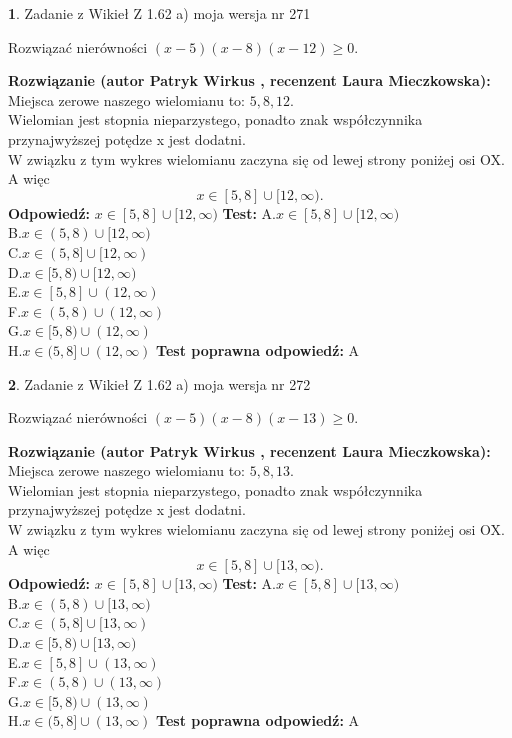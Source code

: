 \documentclass[12pt, a4paper]{article}
\theoremstyle{definition} %
\newtheorem{zad}{}
\newcommand{\zadStart}[1]{\begin{zad}#1\newline}
\newcommand{\zadStop}{\end{zad}}
\newcommand{\rozwStart}[2]{\noindent \textbf{Rozwiązanie (autor #1 , recenzent #2): }\newline}
\newcommand{\rozwStop}{\newline}
\newcommand{\odpStart}{\noindent \textbf{Odpowiedź:}\newline}
\newcommand{\odpStop}{\newline}
\newcommand{\testStart}{\noindent \textbf{Test:}\newline}
\newcommand{\testStop}{\newline}
\newcommand{\kluczStart}{\noindent \textbf{Test poprawna odpowiedź:}\newline}
\newcommand{\kluczStop}{\newline}
\begin{document}
\zadStart{Zadanie z Wikieł Z 1.62 a) moja wersja nr 271}

Rozwiązać nierówności $(x-5)(x-8)(x-12)\ge0$.
\zadStop
\rozwStart{Patryk Wirkus}{Laura Mieczkowska}
Miejsca zerowe naszego wielomianu to: $5, 8, 12$.\\
Wielomian jest stopnia nieparzystego, ponadto znak współczynnika przy\linebreak najwyższej potędze x jest dodatni.\\ W związku z tym wykres wielomianu zaczyna się od lewej strony poniżej osi OX. A więc $$x \in [5,8] \cup [12,\infty).$$
\rozwStop
\odpStart
$x \in [5,8] \cup [12,\infty)$
\odpStop
\testStart
A.$x \in [5,8] \cup [12,\infty)$\\
B.$x \in (5,8) \cup [12,\infty)$\\
C.$x \in (5,8] \cup [12,\infty)$\\
D.$x \in [5,8) \cup [12,\infty)$\\
E.$x \in [5,8] \cup (12,\infty)$\\
F.$x \in (5,8) \cup (12,\infty)$\\
G.$x \in [5,8) \cup (12,\infty)$\\
H.$x \in (5,8] \cup (12,\infty)$
\testStop
\kluczStart
A
\kluczStop



\zadStart{Zadanie z Wikieł Z 1.62 a) moja wersja nr 272}

Rozwiązać nierówności $(x-5)(x-8)(x-13)\ge0$.
\zadStop
\rozwStart{Patryk Wirkus}{Laura Mieczkowska}
Miejsca zerowe naszego wielomianu to: $5, 8, 13$.\\
Wielomian jest stopnia nieparzystego, ponadto znak współczynnika przy\linebreak najwyższej potędze x jest dodatni.\\ W związku z tym wykres wielomianu zaczyna się od lewej strony poniżej osi OX. A więc $$x \in [5,8] \cup [13,\infty).$$
\rozwStop
\odpStart
$x \in [5,8] \cup [13,\infty)$
\odpStop
\testStart
A.$x \in [5,8] \cup [13,\infty)$\\
B.$x \in (5,8) \cup [13,\infty)$\\
C.$x \in (5,8] \cup [13,\infty)$\\
D.$x \in [5,8) \cup [13,\infty)$\\
E.$x \in [5,8] \cup (13,\infty)$\\
F.$x \in (5,8) \cup (13,\infty)$\\
G.$x \in [5,8) \cup (13,\infty)$\\
H.$x \in (5,8] \cup (13,\infty)$
\testStop
\kluczStart
A
\kluczStop
\end{document}
